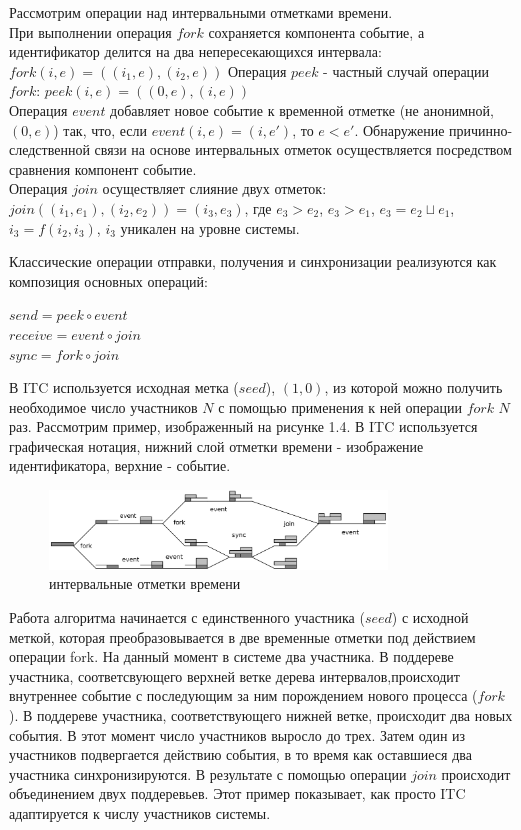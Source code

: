 Рассмотрим операции над интервальными отметками времени.\\
При выполнении операция $fork$ сохраняется компонента событие, а идентификатор делится на два непересекающихся интервала: $fork(i,e) = ((i_1,e),(i_2,e))$  
Операция $peek$ - частный случай операции $fork$: $peek(i,e)=((0,e),(i,e))$\\
Операция $event$ добавляет новое событие к временной отметке (не анонимной, $(0,e)$) так, что, если $event(i,e) = (i,e')$, то $e < e'$. 
Обнаружение причинно-следственной связи на основе интервальных отметок осуществляется посредством сравнения компонент событие.\\
Операция $join$ осуществляет слияние двух отметок: $join((i_1,e_1),(i_2,e_2)) = (i_3,e_3)$, где
$e_3 > e_2$, $e_3 > e_1$, $e_3 = e_2 \sqcup e_1$, $i_3 = f(i_2,i_3)$, $i_3$ уникален на уровне системы.
\par
Классические операции отправки, получения и синхронизации реализуются как композиция основных операций:
\begin{center}
$send = peek \circ event$\\
$receive = event \circ join$\\
$sync = fork \circ join$
\end{center}
В ITC используется исходная метка ($seed$), $(1,0)$, из которой можно получить необходимое число участников $N$ с помощью применения к ней операции $fork$ $N$ раз.
Рассмотрим пример, изображенный на рисунке 1.4. В ITC используется графическая нотация, нижний слой отметки времени - изображение идентификатора, верхние - событие. 
\begin{figure}
\centering
\includegraphics[width=0.8\textwidth]{img/tree.png}
\caption{интервальные отметки времени}
\end{figure}
Работа алгоритма начинается с единственного участника ($seed$) с исходной меткой, которая преобразовывается в две временные отметки под действием операции fork. На данный момент в системе два участника. В поддереве участника, соответсвующего верхней ветке дерева интервалов,происходит внутреннее событие с последующим за ним порождением нового процесса ($fork$). В поддереве участника, соответствующего нижней ветке, происходит два новых события. В этот момент число участников выросло до трех. Затем один из участников подвергается действию события, в то время как оставшиеся два участника синхронизируются. В результате с помощью операции $join$ происходит объединением двух поддеревьев. Этот пример показывает, как просто ITC адаптируется к числу участников системы.

